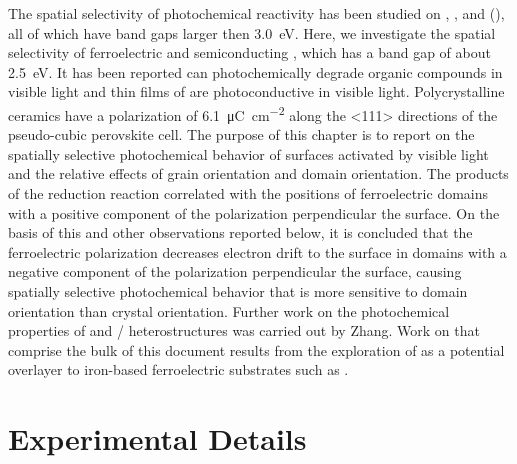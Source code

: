The spatial selectivity of photochemical reactivity has been studied on ,\cite{Giocondi:2001gz,Burbure:2010go,Burbure:2010ti,Bhardwaj:2010eh} ,\cite{Hanson:2006bq} and  (),\cite{Kalinin:2002iw,Tiwari:2009jv} all of which have band gaps larger then \SI{3.0}{\electronvolt}. Here, we investigate the spatial selectivity of ferroelectric and semiconducting , which has a band gap of about \SI{2.5}{\electronvolt}.\cite{Basu:2008hd,Choi:2009gh,Gao:2006fg} It has been reported  can photochemically degrade organic compounds in visible light\cite{Cho:2008ki,Gao:2007eb} and thin films of  are photoconductive in visible light.\cite{Basu:2008hd} Polycrystalline  ceramics have a polarization of \SI{6.1}{\micro\coulomb\per\centi\meter\squared} along the <111> directions of the pseudo-cubic perovskite cell.\cite{Anonymous:2011wx} The purpose of this chapter is to report on the spatially selective photochemical behavior of  surfaces activated by visible light and the relative effects of grain orientation and domain orientation. The products of the reduction reaction correlated with the positions of ferroelectric domains with a positive component of the polarization perpendicular the  surface. On the basis of this and other observations reported below, it is concluded that the ferroelectric polarization decreases electron drift to the surface in domains with a negative component of the polarization perpendicular the surface, causing spatially selective photochemical behavior that is more sensitive to domain orientation than crystal orientation. Further work on the photochemical properties of  and / heterostructures was carried out by Zhang.\cite{Zhang:2011cj} Work on  that comprise the bulk of this document results from the exploration of  as a potential overlayer to iron-based ferroelectric substrates such as .


\section{Experimental Details}
\label{sec:ch7experimental}


